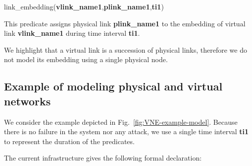 \begin{myformula}
link\_embedding(\textbf{vlink\_name1},\textbf{plink\_name1},\textbf{ti1})
\end{myformula}

This predicate assigns physical link \textbf{plink\_name1} to the embedding of virtual link \textbf{vlink\_name1} during time interval \textbf{ti1}.

We highlight that a virtual link is a succession of physical links, therefore we do not model its embedding using a single physical node.


\subsection{Example of modeling physical and virtual networks}

We consider the example depicted in Fig.~\ref{fig:VNE-example-model}.
Because there is no failure in the system nor any attack, we use a single time interval \textbf{ti1} to represent the duration of the predicates.



The current infrastructure gives the following formal declaration:

